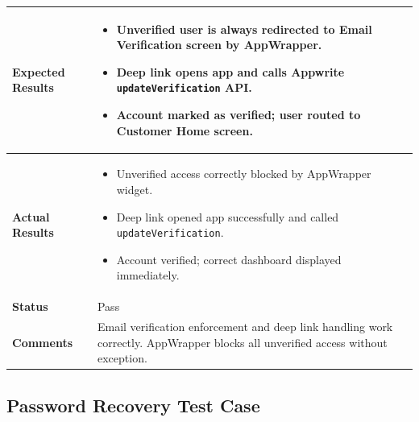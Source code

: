 \begin{table}[H]
\begin{tabular}{|p{3.2cm}|p{10.8cm}|}
\textbf{Expected Results} &
\begin{itemize}[leftmargin=*,noitemsep]
\item Unverified user is always redirected to Email Verification screen by AppWrapper.
\item Deep link opens app and calls Appwrite \texttt{updateVerification} API.
\item Account marked as verified; user routed to Customer Home screen.
\end{itemize} \\ \hline
\textbf{Actual Results} &
\begin{itemize}[leftmargin=*,noitemsep]
\item Unverified access correctly blocked by AppWrapper widget.
\item Deep link opened app successfully and called \texttt{updateVerification}.
\item Account verified; correct dashboard displayed immediately.
\end{itemize} \\ \hline
\textbf{Status} & Pass \\ \hline
\textbf{Comments} & Email verification enforcement and deep link handling work correctly. AppWrapper blocks all unverified access without exception. \\ \hline
\end{tabular}
\end{table}

\newpage
\subsection{Password Recovery Test Case}

